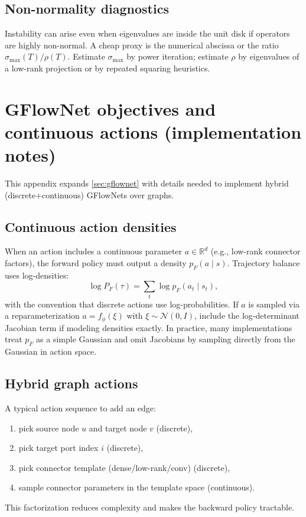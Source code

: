 \documentclass[11pt]{article}
\theoremstyle{definition}
\theoremstyle{plain}
\theoremstyle{remark}
\newcommand{\R}{\mathbb{R}}
\newcommand{\mc}[1]{\mathcal{#1}}
\begin{document}
\subsection{Non-normality diagnostics}
Instability can arise even when eigenvalues are inside the unit disk if operators are highly non-normal.
A cheap proxy is the numerical abscissa or the ratio $\sigma_{\max}(T)/\rho(T)$.
Estimate $\sigma_{\max}$ by power iteration; estimate $\rho$ by eigenvalues of a low-rank projection or by repeated squaring heuristics.

\section{GFlowNet objectives and continuous actions (implementation notes)}
\label{app:gflownet-details}

This appendix expands \cref{sec:gflownet} with details needed to implement hybrid (discrete+continuous) GFlowNets over graphs.

\subsection{Continuous action densities}
When an action includes a continuous parameter $a\in\R^d$ (e.g., low-rank connector factors), the forward policy must output a density $p_F(a\mid s)$.
Trajectory balance uses log-densities:
\[
\log P_F(\tau) = \sum_t \log p_F(a_t\mid s_t),
\]
with the convention that discrete actions use log-probabilities.
If $a$ is sampled via a reparameterization $a=f_\phi(\xi)$ with $\xi\sim \mc{N}(0,I)$, include the log-determinant Jacobian term if modeling densities exactly.
In practice, many implementations treat $p_F$ as a simple Gaussian and omit Jacobians by sampling directly from the Gaussian in action space.

\subsection{Hybrid graph actions}
A typical action sequence to add an edge:
\begin{enumerate}[leftmargin=2em]
\item pick source node $u$ and target node $v$ (discrete),
\item pick target port index $i$ (discrete),
\item pick connector template (dense/low-rank/conv) (discrete),
\item sample connector parameters in the template space (continuous).
\end{enumerate}
This factorization reduces complexity and makes the backward policy tractable.
\end{document}

